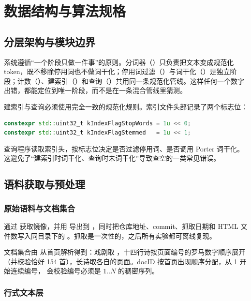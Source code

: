 \chapter{数据结构与算法规格}\label{ch:design}

\section{分层架构与模块边界}

系统遵循“一个阶段只做一件事”的原则。分词器（）只负责把文本变成规范化 token，既不移除停用词也不做词干化；停用词过滤（）与词干化（）是独立阶段；计数（）、建索引（）和查询（）共用同一条规范化管线。这样任何一个数字出错，都能定位到唯一阶段，而不是在一条混合管线里猜测。

建索引与查询必须使用完全一致的规范化规则。索引文件头部记录了两个标志位：

\begin{lstlisting}[language=C++]
constexpr std::uint32_t kIndexFlagStopWords = 1u << 0;
constexpr std::uint32_t kIndexFlagStemmed   = 1u << 1;
\end{lstlisting}

查询程序读取索引头，按标志位决定是否过滤停用词、是否调用 Porter 词干化。这避免了“建索引时词干化、查询时未词干化”导致查空的一类常见错误。

\section{语料获取与预处理}

\subsection{原始语料与文档集合}

 通过  获取镜像，并用  导出到 ，同时把仓库地址、commit、抓取日期和 HTML 文件数写入同目录下的 。抓取是一次性的，之后所有实验都可离线复现。

文档集合由  从首页解析得到：戏剧取 ，十四行诗按页面编号的罗马数字顺序展开（并校验恰好 154 首），长诗取各自的页面。docID 按首页出现顺序分配，从 1 开始连续编号， 会校验编号必须是 $1..N$ 的稠密序列。

\subsection{行式文本层}

